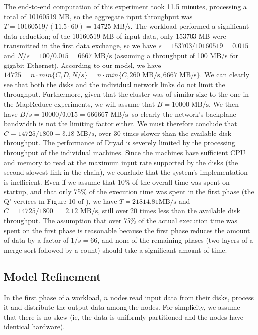 \documentclass{acm_proc_article-sp}
\begin{document}
The end-to-end computation of this experiment took 11.5 minutes, processing a total of 10160519 MB, so the aggregate input throughput was $T = 10160519 / (11.5 \cdot 60) = 14725 \text{ MB/s}$. The workload performed a significant data reduction; of the 10160519 MB of input data, only 153703 MB were transmitted in the first data exchange, so we have $s = 153703 / 10160519 = 0.015$ and $N/s = 100/0.015 = 6667 \text{ MB/s}$ (assuming a throughput of 100 MB/s for gigabit Ethernet). According to our model, we have $14725 = n \cdot min\{C, D, N/s\} = n \cdot min\{C, 260 \text{ MB/s}, 6667 \text{ MB/s}\}$. We can clearly see that both the disks and the individual network links do not limit the throughput. Furthermore, given that the cluster was of similar size to the one in the MapReduce experiments, we will assume that $B = 10000 \text{ MB/s}$. We then have $B/s = 10000/0.015 = 666667 \text{ MB/s}$, so clearly the network's backplane bandwidth is not the limiting factor either. We must therefore conclude that $C = 14725 / 1800 = 8.18 \text{ MB/s}$, over 30 times slower than the available disk throughput. The performance of Dryad is severely limited by the processing throughput of the individual machines. Since the machines have sufficient CPU and memory to read at the maximum input rate supported by the disks (the second-slowest link in the chain), we conclude that the system's implementation is inefficient. Even if we assume that 10\% of the overall time was spent on startup, and that only 75\% of the execution time was spent in the first phase (the Q' vertices in Figure 10 of \cite{dryad}), we have $T = 21814.81 \text{MB/s}$ and $C = 14725 / 1800 = 12.12 \text{ MB/s}$, still over 20 times less than the available disk throughput. The assumption that over 75\% of the actual execution time was spent on the first phase is reasonable because the first phase reduces the amount of data by a factor of $1/s = 66$, and none of the remaining phases  (two layers of a merge sort followed by a count) should take a significant amount of time.

\subsection{Model Refinement}
In the first phase of a workload, $n$ nodes read input data from their disks, process it and distribute the output data among the nodes. For simplicity, we assume that there is no skew (ie, the data is uniformly partitioned and the nodes have identical hardware). 
\end{document}
